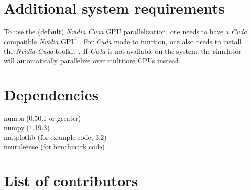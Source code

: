 \documentclass{jors}
\begin{document}
\section{Additional system requirements}
To use the (default) \emph{Nvidia Cuda} GPU parallelization, one needs to have a \emph{Cuda} compatible \emph{Nvidia} GPU~\cite{noauthor_cuda_2012}.
For \emph{Cuda} mode to function, one also needs to install the \emph{Nvidia Cuda} toolkit~\cite{noauthor_cuda_2013}.
If \emph{Cuda} is not available on the system, the simulator will automatically parallelize over multicore CPUs instead.

\section{Dependencies}
numba (0.50.1 or greater)\\
numpy (1.19.3)\\
matplotlib (for example code, 3.2)\\
neuralsense (for benchmark code)

\section{List of contributors}
\end{document}
